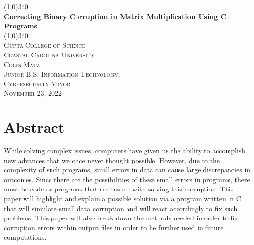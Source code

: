 \documentclass{article}
\begin{document}
    \begin{titlepage}
        \begin{center}
            \line(1,0){340} \\
            [5mm]
            \huge{\bfseries Correcting Binary Corruption in Matrix Multiplication Using C Programs} \\
            \line(1,0){340} \\
            [.25 in]
            \textsc{\LARGE Gupta College of Science} \\
            \textsc{\LARGE Coastal Carolina University} \\
            [.25 in]
            \textsc{\LARGE Colin Matz \\
            Junior B.S. Information Technology, \\ 
            Cybersecurity Minor \\
            November 23, 2022} \\
        \end{center}
    \end{titlepage}

    \section*{Abstract}\label{sec:abstract}
    While solving complex issues, computers have given us the ability to accomplish new advances that 
    we once never thought possible. However, due to the complexity of such programs, small errors in data
    can cause large discrepancies in outcomes. Since there are the possibilities of these small errors in
    programs, there must be code or programs that are tasked with solving this corruption. This paper will
    highlight and explain a possible solution via a program written in C that will simulate small data
    corruption and will react accordingly to fix such problems. This paper will also break down the methods
    needed in order to fix corruption errors within output files in order to be further used in future 
    computations.


    \listoffigures

    \listoftables
    \newpage
\end{document}
